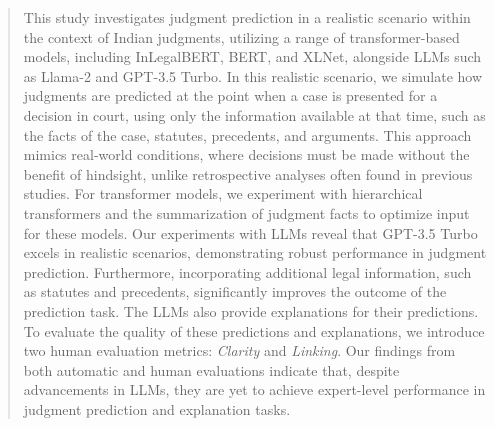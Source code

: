 \begin{abstract}
This study investigates judgment prediction in a realistic scenario within the context of Indian judgments, utilizing a range of transformer-based models, including InLegalBERT, BERT, and XLNet, alongside LLMs such as Llama-2 and GPT-3.5 Turbo. In this realistic scenario, we simulate how judgments are predicted at the point when a case is presented for a decision in court, using only the information available at that time, such as the facts of the case, statutes, precedents, and arguments. This approach mimics real-world conditions, where decisions must be made without the benefit of hindsight, unlike retrospective analyses often found in previous studies. For transformer models, we experiment with hierarchical transformers and the summarization of judgment facts to optimize input for these models. Our experiments with LLMs reveal that GPT-3.5 Turbo excels in realistic scenarios, demonstrating robust performance in judgment prediction. Furthermore, incorporating additional legal information, such as statutes and precedents, significantly improves the outcome of the prediction task. The LLMs also provide explanations for their predictions. To evaluate the quality of these predictions and explanations, we introduce two human evaluation metrics: \textit{Clarity} and \textit{Linking}. Our findings from both automatic and human evaluations indicate that, despite advancements in LLMs, they are yet to achieve expert-level performance in judgment prediction and explanation tasks.
\end{abstract}

